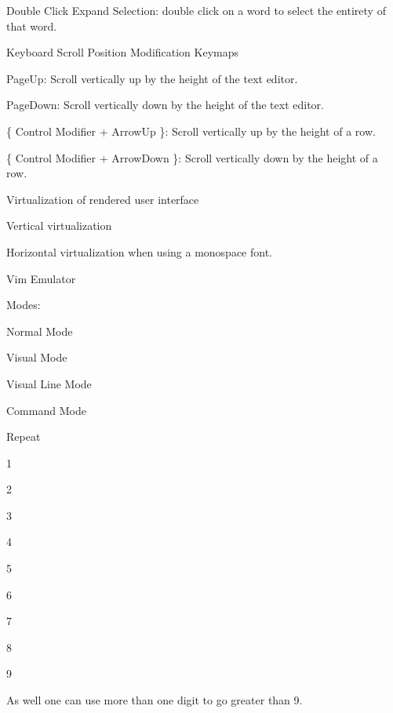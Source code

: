 \begin{DoxyItemize}
\begin{DoxyItemize}
\item {\ttfamily Double Click Expand Selection}\+: double click on a word to select the entirety of that word.
\end{DoxyItemize}
\item {\ttfamily Keyboard Scroll Position Modification Keymaps}
\begin{DoxyItemize}
\item {\ttfamily Page\+Up}\+: Scroll vertically up by the height of the text editor.
\item {\ttfamily Page\+Down}\+: Scroll vertically down by the height of the text editor.
\item \{ {\ttfamily Control Modifier} + {\ttfamily Arrow\+Up} \}\+: Scroll vertically up by the height of a row.
\item \{ {\ttfamily Control Modifier} + {\ttfamily Arrow\+Down} \}\+: Scroll vertically down by the height of a row.
\end{DoxyItemize}
\item {\ttfamily Virtualization} of rendered user interface
\begin{DoxyItemize}
\item {\ttfamily Vertical} virtualization
\item {\ttfamily Horizontal} virtualization {\ttfamily when using a monospace font}.
\end{DoxyItemize}
\item {\ttfamily Vim Emulator}
\begin{DoxyItemize}
\item {\ttfamily Modes}\+:
\begin{DoxyItemize}
\item {\ttfamily Normal} Mode
\item {\ttfamily Visual} Mode
\item {\ttfamily Visual Line} Mode
\item {\ttfamily Command} Mode
\end{DoxyItemize}
\item {\ttfamily Repeat}
\begin{DoxyItemize}
\item 1
\item 2
\item 3
\item 4
\item 5
\item 6
\item 7
\item 8
\item 9
\item As well one can use more than one digit to go greater than 9.

\end{DoxyItemize}
\end{DoxyItemize}
\end{DoxyItemize}
